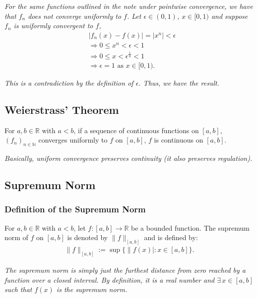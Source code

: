 \documentclass[a4paper, 12pt, twoside]{article}
\begin{document}
\textit{For the same functions outlined in the note under pointwise
convergence, we have that $f_n$ does not converge uniformly to $f$.
Let $\epsilon \in (0, 1)$, $x \in [0, 1)$ and suppose $f_n$ is
uniformly convergent to $f$,}
\begin{align*}
       & |f_n(x)-f(x)| = |x^n| < \epsilon                   \\
       & \Rightarrow 0 \leq x^n < \epsilon < 1              \\
       & \Rightarrow 0 \leq x < \epsilon^{\frac{1}{n}} < 1  \\
       & \Rightarrow \epsilon = 1 \text{ as } x \in [0, 1).
\end{align*}

\textit{This is a contradiction by the definition of $\epsilon$.
      Thus, we have the result.}

\subsection{Weierstrass' Theorem}

For $a, b \in \mathbb{R}$ with $a < b$, if a sequence of continuous
functions on $[a, b]$, $(f_n)_{n \in \mathbb{N}}$ converges
uniformly to $f$ on $[a, b]$, $f$ is continuous on $[a, b]$.

\vspace{\baselineskip}

\textit{Basically, uniform convergence preserves continuity (it also
      preserves regulation).}

\subsection{Supremum Norm}

\subsubsection{Definition of the Supremum Norm}

For $a, b \in \mathbb{R}$ with $a < b$, let $f:[a, b]\to\mathbb{R}$
be a bounded function. The supremum norm of $f$ on $[a,b]$ is
denoted by $\|f\|_{[a,b]}$ and is defined by:
\begin{align*}
      \|f\|_{[a,b]} := \sup{\{\|f(x)| : x \in [a,b]\}}.
\end{align*}

\textit{The supremum norm is simply just the furthest distance from
      zero reached by a function over a closed interval. By definition,
      it is a real number and $\exists\,x \in [a, b]$ such that $f(x)$ is
      the supremum norm.}
\end{document}
